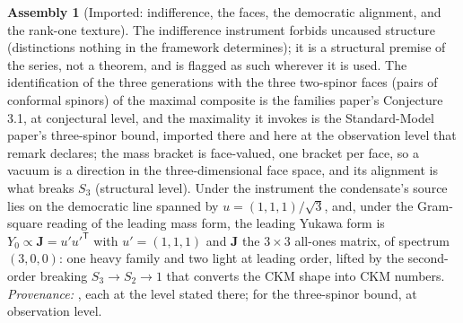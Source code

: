 \documentclass[11pt]{article}
\theoremstyle{definition}
\newtheorem{assembled}[theorem]{Assembly}
\theoremstyle{plain}
\newcommand{\changedmark}[2]{\marginpar{\raggedright\scriptsize\color{#1}#2}}
\providecommand{\J}{}\renewcommand{\J}{\mathbf{J}}
\begin{document}
\begin{assembled}[Imported: indifference, the faces, the democratic alignment, and the rank-one texture]\label{c:neutrino.imported-indifference-faces-democratic-alignment-rank}
\changedmark{gray}{reworded}
The indifference instrument forbids uncaused structure (distinctions nothing in the framework determines); it is a structural premise of the series, not a theorem, and is flagged as such wherever it is used. The identification of the three generations with the three two-spinor faces (pairs of conformal spinors) of the maximal composite is the families paper's Conjecture 3.1, at conjectural level, and the maximality it invokes is the Standard-Model paper's three-spinor bound, imported there and here at the observation level that remark declares; the mass bracket is face-valued, one bracket per face, so a vacuum is a direction in the three-dimensional face space, and its alignment is what breaks $S_{3}$ (structural level). Under the instrument the condensate's source lies on the democratic line spanned by $u = (1,1,1)/\sqrt{3}$, and, under the Gram-square reading of the leading mass form, the leading Yukawa form is $Y_{0} \propto \J = u'u'^{\mathsf{T}}$ with $u' = (1,1,1)$ and $\J$ the $3 \times 3$ all-ones matrix, of spectrum $(3, 0, 0)$: one heavy family and two light at leading order, lifted by the second-order breaking $S_{3} \to S_{2} \to 1$ that converts the CKM shape into CKM numbers. \emph{Provenance:} \cite[Fact~2.5, Conj.~3.1, Prop.~4.3, Prop.~4.4(1)]{ButlerT13}, each at the level stated there; \cite[Rem.~3.3]{ButlerT12} for the three-spinor bound, at observation level.
\end{assembled}
\end{document}
